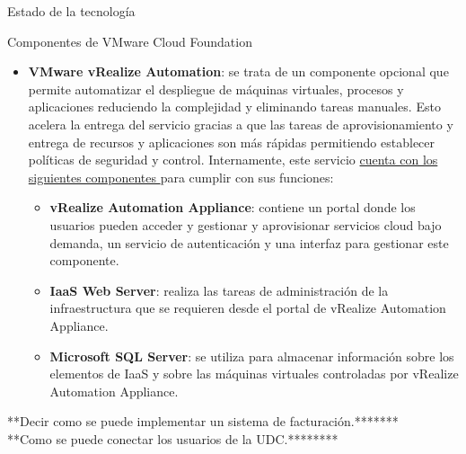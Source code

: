 \begin{section}{Estado de la tecnología}
\begin{subsection}{Componentes de VMware Cloud Foundation \cite{componentesCloudFound}}
\begin{itemize}
    
    \item \textbf{VMware vRealize Automation}: se trata de un componente opcional que permite automatizar el despliegue de máquinas virtuales, procesos y aplicaciones reduciendo la complejidad y eliminando tareas manuales. Esto acelera la entrega del servicio gracias a que las tareas de aprovisionamiento y entrega de recursos y aplicaciones son más rápidas permitiendo establecer políticas de seguridad y control. Internamente, este servicio \underline{cuenta con los siguientes componentes \cite{vRealizeAutomation}} para cumplir con sus funciones:
    \begin{itemize}
        \item \textbf{vRealize Automation Appliance}: contiene un portal donde los usuarios pueden acceder y gestionar y aprovisionar servicios cloud bajo demanda, un servicio de autenticación y una interfaz para gestionar este componente. 
        \item \textbf{IaaS Web Server}: realiza las tareas de administración de la infraestructura que se requieren desde el portal de vRealize Automation Appliance.
        \item \textbf{Microsoft SQL Server}: se utiliza para almacenar información sobre los elementos de IaaS y sobre las máquinas virtuales controladas por vRealize Automation Appliance.
    \end{itemize}
\end{itemize}

**Decir como se puede implementar un sistema de facturación.*******\\
**Como se puede conectar los usuarios de la UDC.********














\end{subsection}
\end{section}
